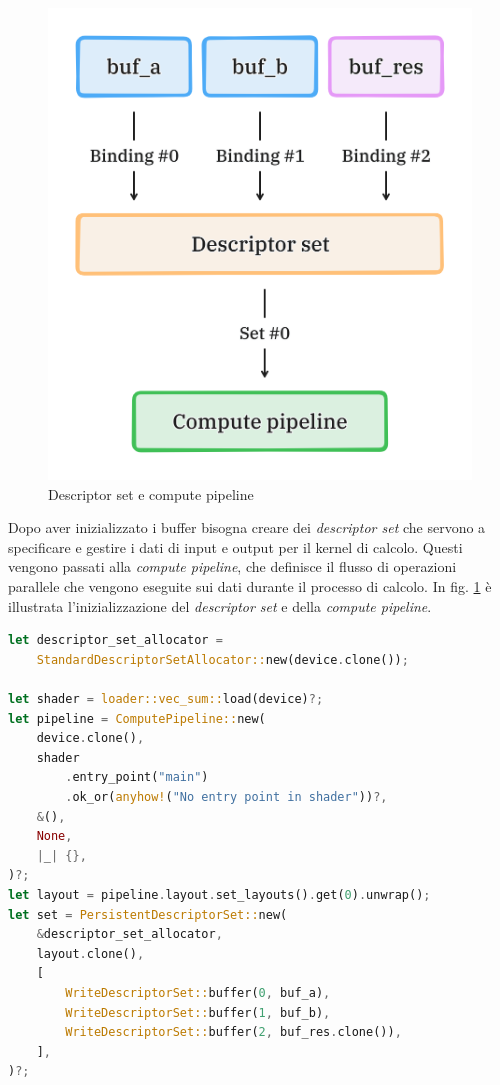 \begin{figure}[ht]
    \centering
    \includegraphics[width=.5\linewidth]{images/chapter2/pipeline.png}
    \caption{Descriptor set e compute pipeline}
    \label{fig:vulkan_pipeline}
\end{figure}

Dopo aver inizializzato i buffer bisogna creare dei \textit{descriptor set} che servono a specificare e gestire i dati di input e output per il kernel di calcolo. Questi vengono passati alla \textit{compute pipeline}, che definisce il flusso di operazioni parallele che vengono eseguite sui dati durante il processo di calcolo. In  fig. \ref{fig:vulkan_pipeline} è illustrata l'inizializzazione del \textit{descriptor set} e della \textit{compute pipeline}.

\newpage 

\vspace{5mm}
\begin{lstlisting}[language=Rust, caption=Inizializzazione della compute pipeline, label=lis:vulkan_pipeline]
let descriptor_set_allocator = 
    StandardDescriptorSetAllocator::new(device.clone());

let shader = loader::vec_sum::load(device)?;
let pipeline = ComputePipeline::new(
    device.clone(),
    shader
        .entry_point("main")
        .ok_or(anyhow!("No entry point in shader"))?,
    &(),
    None,
    |_| {},
)?;
let layout = pipeline.layout.set_layouts().get(0).unwrap();
let set = PersistentDescriptorSet::new(
    &descriptor_set_allocator,
    layout.clone(),
    [
        WriteDescriptorSet::buffer(0, buf_a),
        WriteDescriptorSet::buffer(1, buf_b),
        WriteDescriptorSet::buffer(2, buf_res.clone()),
    ],
)?;
\end{lstlisting}
\vspace{5mm}

